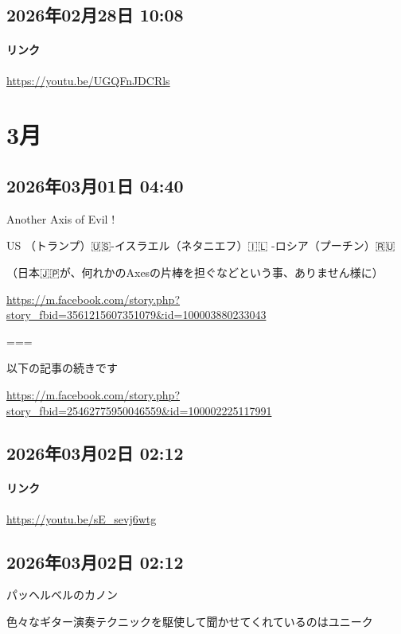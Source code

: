 \subsection*{2026年02月28日 10:08}

\paragraph{リンク}
\url{https://youtu.be/UGQFnJDCRls}

\section{3月}

\subsection*{2026年03月01日 04:40}

Another Axis of Evil !

US （トランプ）🇺🇸-イスラエル（ネタニエフ）🇮🇱 -ロシア（プーチン）🇷🇺

（日本🇯🇵が、何れかのAxesの片棒を担ぐなどという事、ありません様に）

\url{https://m.facebook.com/story.php?story_fbid=3561215607351079&id=100003880233043}

===

以下の記事の続きです

\url{https://m.facebook.com/story.php?story_fbid=25462775950046559&id=100002225117991}

\subsection*{2026年03月02日 02:12}

\paragraph{リンク}
\url{https://youtu.be/sE_sevj6wtg}

\subsection*{2026年03月02日 02:12}

パッヘルベルのカノン

色々なギター演奏テクニックを駆使して聞かせてくれているのはユニーク

